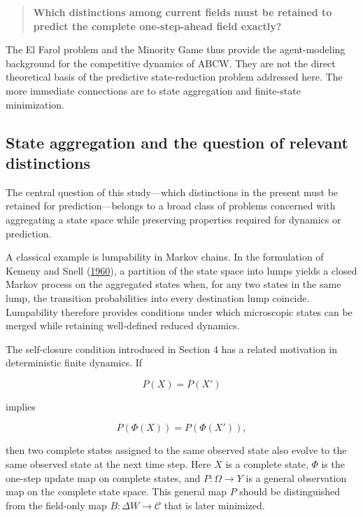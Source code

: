 \documentclass[
  11pt,
]{article}
\begin{document}
\begin{quote}
\textbf{Which distinctions among current fields must be retained to
predict the complete one-step-ahead field exactly?}
\end{quote}

The El Farol problem and the Minority Game thus provide the
agent-modeling background for the competitive dynamics of ABCW. They are
not the direct theoretical basis of the predictive state-reduction
problem addressed here. The more immediate connections are to state
aggregation and finite-state minimization.

\hypertarget{state-aggregation-and-the-question-of-relevant-distinctions}{%
\subsection{State aggregation and the question of relevant
distinctions}\label{state-aggregation-and-the-question-of-relevant-distinctions}}

The central question of this study---which distinctions in the present
must be retained for prediction---belongs to a broad class of problems
concerned with aggregating a state space while preserving properties
required for dynamics or prediction.

A classical example is lumpability in Markov chains. In the formulation
of Kemeny and Snell (\protect\hyperlink{ref-kemeny1960}{1960}), a
partition of the state space into lumps yields a closed Markov process
on the aggregated states when, for any two states in the same lump, the
transition probabilities into every destination lump coincide.
Lumpability therefore provides conditions under which microscopic states
can be merged while retaining well-defined reduced dynamics.

The self-closure condition introduced in Section 4 has a related
motivation in deterministic finite dynamics. If

\[{P(X)=P(X')}\]

implies

\[{P(\Phi(X))=P(\Phi(X')),}\]

then two complete states assigned to the same observed state also evolve
to the same observed state at the next time step. Here \({X}\) is a
complete state, \({\Phi}\) is the one-step update map on complete
states, and \({P:\Omega\to Y}\) is a general observation map on the
complete state space. This general map \({P}\) should be distinguished
from the field-only map \({B:\Delta W\to\mathcal C}\) that is later
minimized.
\end{document}
